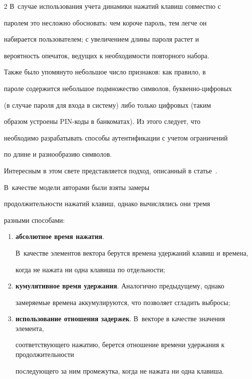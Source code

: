 \begin{multicols}{2}
В~случае использования учета динамики нажатий клавиш совместно с

паролем это несложно обосновать: чем короче пароль, тем легче он

набирается пользователем; с увеличением длины пароля растет и

вероятность опечаток, ведущих к необходимости повторного набора.

Также было упомянуто небольшое число признаков: как правило, в

пароле содержится небольшое подмножество символов, бук\-вен\-но-циф\-ро\-вых

(в случае пароля для входа в сис\-те\-му) либо только цифровых (таким

образом устроены PIN-ко\-ды в банкоматах). Из этого следует, что

необходимо разрабатывать способы аутентификации с учетом ограничений

по длине и разнообразию символов.



Интересным в этом свете представляется подход, описанный в статье~\cite{saggio}. 

В~качестве модели авторами были взяты замеры

продолжительности нажатий клавиш, однако вычислялись они тремя

разными способами:

\begin{enumerate}[(1)]

    \item {\bf абсолютное время нажатия}. 

    В~качестве элементов вектора берутся времена удержаний клавиш и времена, 

    когда не нажата ни одна клавиша по отдельности;

    \item {\bf кумулятивное время удержания}. Аналогично предыдущему, однако 

    замеряемые времена аккумулируются, что позволяет сгладить вы\-бросы;

    \item {\bf использование отношения задержек}. В~векторе в качестве значения элемента, 

    соответствующего нажатию, берется отношение времени удержания к продолжительности 

    последующего за ним промежутка, когда не нажата ни одна клавиша.

\end{enumerate}


\end{multicols}
